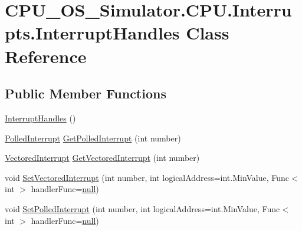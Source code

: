 \hypertarget{class_c_p_u___o_s___simulator_1_1_c_p_u_1_1_interrupts_1_1_interrupt_handles}{}\section{C\+P\+U\+\_\+\+O\+S\+\_\+\+Simulator.\+C\+P\+U.\+Interrupts.\+Interrupt\+Handles Class Reference}
\label{class_c_p_u___o_s___simulator_1_1_c_p_u_1_1_interrupts_1_1_interrupt_handles}
\subsection*{Public Member Functions}
\begin{DoxyCompactItemize}
\item 
\hyperlink{class_c_p_u___o_s___simulator_1_1_c_p_u_1_1_interrupts_1_1_interrupt_handles_ac4622dfb056257e010e790ab00edb680}{Interrupt\+Handles} ()
\item 
\hyperlink{class_c_p_u___o_s___simulator_1_1_c_p_u_1_1_interrupts_1_1_polled_interrupt}{Polled\+Interrupt} \hyperlink{class_c_p_u___o_s___simulator_1_1_c_p_u_1_1_interrupts_1_1_interrupt_handles_a53bd44c7df008d1b150940b885f7e9ee}{Get\+Polled\+Interrupt} (int number)
\item 
\hyperlink{class_c_p_u___o_s___simulator_1_1_c_p_u_1_1_interrupts_1_1_vectored_interrupt}{Vectored\+Interrupt} \hyperlink{class_c_p_u___o_s___simulator_1_1_c_p_u_1_1_interrupts_1_1_interrupt_handles_a1322ac21b33ab14586a5eba979be54cc}{Get\+Vectored\+Interrupt} (int number)
\item 
void \hyperlink{class_c_p_u___o_s___simulator_1_1_c_p_u_1_1_interrupts_1_1_interrupt_handles_a5516579275f57f8852fd0ca04017815e}{Set\+Vectored\+Interrupt} (int number, int logical\+Address=int.\+Min\+Value, Func$<$ int $>$ handler\+Func=\hyperlink{_old_01_process_01_flags_8cs_afb8e110345c45e74478894341ab6b28e}{null})
\item 
void \hyperlink{class_c_p_u___o_s___simulator_1_1_c_p_u_1_1_interrupts_1_1_interrupt_handles_a38721e70fd6d8f32133850e1681e3afb}{Set\+Polled\+Interrupt} (int number, int logical\+Address=int.\+Min\+Value, Func$<$ int $>$ handler\+Func=\hyperlink{_old_01_process_01_flags_8cs_afb8e110345c45e74478894341ab6b28e}{null})
\end{DoxyCompactItemize}
